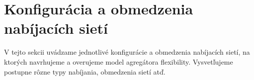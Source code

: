 








\section{Konfigurácia  a obmedzenia nabíjacích sietí}
\label{vych:konfaobmedzenia}

V tejto sekcii uvádzame jednotlivé konfigurácie a obmedzenia nabíjacích sietí, na ktorých navrhujeme a overujeme model agregátora flexibility. Vysvetľujeme postupne rôzne typy nabíjania, obmedzenia sietí atď.



